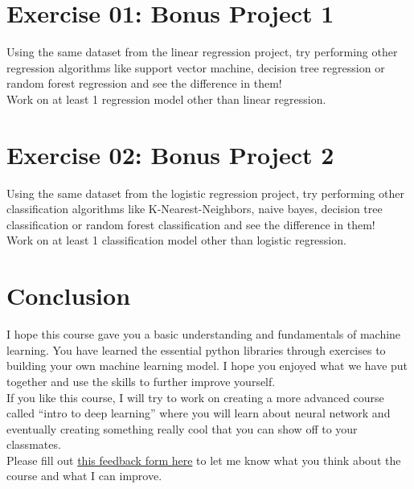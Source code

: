 \documentclass{42-en}
\begin{document}
\chapter{Exercise 01: Bonus Project 1}
\makeheaderfiles

Using the same dataset from the linear regression project, try performing other regression algorithms like support vector machine, decision tree regression or random forest regression and see the difference in them!\\
Work on at least 1 regression model other than linear regression.

\nextexercice
\newpage

\chapter{Exercise 02: Bonus Project 2}
\makeheaderfiles

Using the same dataset from the logistic regression project, try performing other classification algorithms like K-Nearest-Neighbors, naive bayes, decision tree classification or random forest classification and see the difference in them!\\
Work on at least 1 classification model other than logistic regression.

\nextexercice
\newpage


 \chapter{Conclusion}

I hope this course gave you a basic understanding and fundamentals of machine learning. You have learned the essential python libraries through exercises to building your own machine learning model. I hope you enjoyed what we have put together and use the skills to further improve yourself.\\
If you like this course, I will try to work on creating a more advanced course called “intro to deep learning” where you will learn about neural network and eventually creating something really cool that you can show off to your classmates.\\
Please fill out \href{https://goo.gl/forms/PcRd7YRTuRPBDFKx2}{this feedback form here} to let me know what you think about the course and what I can improve.
\end{document}

